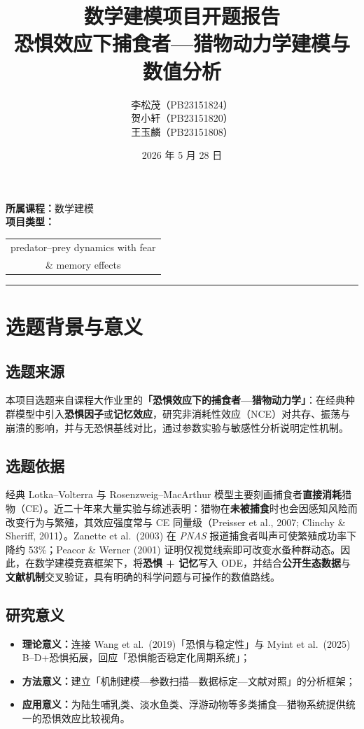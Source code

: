 \documentclass[12pt,a4paper]{ctexart}
\title{\textbf{数学建模项目开题报告}\\[0.4em]
\large 恐惧效应下捕食者—猎物动力学建模与数值分析}
\author{%
  李松茂（PB23151824）\\[0.2em]
  贺小轩（PB23151820）\\[0.2em]
  王玉麟（PB23151808）%
}
\date{2026 年 5 月 28 日}
\makeatletter
\newcommand{\projecttype}{%
  \begin{tabular}{@{}c@{}}
    predator--prey dynamics with fear \\
    \& memory effects
  \end{tabular}}
\makeatother
\begin{document}
\maketitle

\begin{center}
\small
\textbf{所属课程：}数学建模\\[0.3em]
\textbf{项目类型：}\\[0.3em]
{\footnotesize \projecttype}
\end{center}

\vspace{0.5em}
\hrule
\vspace{1em}

\section{选题背景与意义}

\subsection{选题来源}

本项目选题来自课程大作业里的\textbf{「恐惧效应下的捕食者—猎物动力学」}：在经典种群模型中引入\textbf{恐惧因子}或\textbf{记忆效应}，研究非消耗性效应（NCE）对共存、振荡与崩溃的影响，并与无恐惧基线对比，通过参数实验与敏感性分析说明定性机制。

\subsection{选题依据}

经典 Lotka--Volterra 与 Rosenzweig--MacArthur 模型主要刻画捕食者\textbf{直接消耗}猎物（CE）。近二十年来大量实验与综述表明：猎物在\textbf{未被捕食}时也会因感知风险而改变行为与繁殖，其效应强度常与 CE 同量级（Preisser et al., 2007; Clinchy \& Sheriff, 2011）。Zanette et al.\ (2003) 在 \emph{PNAS} 报道捕食者叫声可使繁殖成功率下降约 53\%；Peacor \& Werner (2001) 证明仅视觉线索即可改变水蚤种群动态。因此，在数学建模竞赛框架下，将\textbf{恐惧 + 记忆}写入 ODE，并结合\textbf{公开生态数据}与\textbf{文献机制}交叉验证，具有明确的科学问题与可操作的数值路线。

\subsection{研究意义}

\begin{itemize}[leftmargin=2em]
  \item \textbf{理论意义：}连接 Wang et al.\ (2019)「恐惧与稳定性」与 Myint et al.\ (2025) B--D+恐惧拓展，回应「恐惧能否稳定化周期系统」；
  \item \textbf{方法意义：}建立「机制建模—参数扫描—数据标定—文献对照」的分析框架；
  \item \textbf{应用意义：}为陆生哺乳类、淡水鱼类、浮游动物等多类捕食—猎物系统提供统一的恐惧效应比较视角。
\end{itemize}
\end{document}
